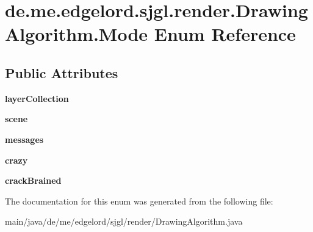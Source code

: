 \hypertarget{enumde_1_1me_1_1edgelord_1_1sjgl_1_1render_1_1_drawing_algorithm_1_1_mode}{}\section{de.\+me.\+edgelord.\+sjgl.\+render.\+Drawing\+Algorithm.\+Mode Enum Reference}
\label{enumde_1_1me_1_1edgelord_1_1sjgl_1_1render_1_1_drawing_algorithm_1_1_mode}
\subsection*{Public Attributes}
\begin{DoxyCompactItemize}
\item 
\mbox{\label{enumde_1_1me_1_1edgelord_1_1sjgl_1_1render_1_1_drawing_algorithm_1_1_mode_a25dfe715fb289db0352374559157aab6}} 
{\bfseries layer\+Collection}
\item 
\mbox{\label{enumde_1_1me_1_1edgelord_1_1sjgl_1_1render_1_1_drawing_algorithm_1_1_mode_ac7ea17e03e686ee98d9bd3bfac38b807}} 
{\bfseries scene}
\item 
\mbox{\label{enumde_1_1me_1_1edgelord_1_1sjgl_1_1render_1_1_drawing_algorithm_1_1_mode_af9f86cc98b31b9db89f5864bc4fa91b3}} 
{\bfseries messages}
\item 
\mbox{\label{enumde_1_1me_1_1edgelord_1_1sjgl_1_1render_1_1_drawing_algorithm_1_1_mode_a05cd7fd588cec9491d0b5ed754ba387f}} 
{\bfseries crazy}
\item 
\mbox{\label{enumde_1_1me_1_1edgelord_1_1sjgl_1_1render_1_1_drawing_algorithm_1_1_mode_aa7365e345f86617b6730005c473db0fe}} 
{\bfseries crack\+Brained}
\end{DoxyCompactItemize}


The documentation for this enum was generated from the following file\+:\begin{DoxyCompactItemize}
\item 
main/java/de/me/edgelord/sjgl/render/Drawing\+Algorithm.\+java\end{DoxyCompactItemize}

